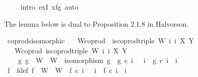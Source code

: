 \begin{isabellebody}
\ \ \ \ \isamarkupfalse%
{\isacharparenleft}{\kern0pt}intro\ exI{\isacharbrackleft}{\kern0pt}\ x{\isacharequal}{\kern0pt}{\isachardoublequoteopen}f{\isasymamalg}g{\isachardoublequoteclose}{\isacharbrackright}{\kern0pt}{\isacharcomma}{\kern0pt}\ auto{\isacharparenright}{\kern0pt}\isanewline
{}\isamarkupfalse%
%
\endisatagproof
{\isafoldproof}%
%
\isadelimproof
%
\endisadelimproof
%
\begin{isamarkuptext}%
The lemma below is dual to Proposition 2.1.8 in Halvorson.%
\end{isamarkuptext}\isamarkuptrue%
\isamarkupfalse%
\ coprods{\isacharunderscore}{\kern0pt}isomorphic{\isacharcolon}{\kern0pt}\isanewline
\ \ \ W{\isacharunderscore}{\kern0pt}coprod{\isacharcolon}{\kern0pt}\ \ {\isachardoublequoteopen}is{\isacharunderscore}{\kern0pt}coprod{\isacharunderscore}{\kern0pt}triple\ {\isacharparenleft}{\kern0pt}W{\isacharcomma}{\kern0pt}\ i\ i\ X\ Y{\isachardoublequoteclose}\isanewline
\ \ \ W{\isacharprime}{\kern0pt}{\isacharunderscore}{\kern0pt}coprod{\isacharcolon}{\kern0pt}\ {\isachardoublequoteopen}is{\isacharunderscore}{\kern0pt}coprod{\isacharunderscore}{\kern0pt}triple\ {\isacharparenleft}{\kern0pt}W{\isacharprime}{\kern0pt}{\isacharcomma}{\kern0pt}\ i{\isacharprime}{\kern0pt}\ i{\isacharprime}{\kern0pt}\ X\ Y{\isachardoublequoteclose}\isanewline
\ \ \ {\isachardoublequoteopen}{\isasymexists}\ g{\isachardot}{\kern0pt}\ g\ {\isacharcolon}{\kern0pt}\ W\ {\isasymrightarrow}\ W{\isacharprime}{\kern0pt}\ {\isasymand}\ isomorphism\ g\ {\isasymand}\ g\ {\isasymcirc}\isactrlsub c\ i\ \ {\isacharequal}{\kern0pt}\ i{\isacharprime}{\kern0pt}\ {\isasymand}\ g\ {\isasymcirc}\isactrlsub c\ i\ {\isacharequal}{\kern0pt}\ i{\isacharprime}{\kern0pt}\isanewline
%
\isadelimproof
%
\endisadelimproof
%
\isatagproof
{}\isamarkupfalse%
\ {\isacharminus}{\kern0pt}\isanewline
\ \ \isamarkupfalse%
\ f\ \ f{\isacharunderscore}{\kern0pt}def{\isacharcolon}{\kern0pt}\ {\isachardoublequoteopen}f\ {\isacharcolon}{\kern0pt}\ W{\isacharprime}{\kern0pt}\ {\isasymrightarrow}\ W\ {\isasymand}\ f\ {\isasymcirc}\isactrlsub c\ i{\isacharprime}{\kern0pt}\ \ {\isacharequal}{\kern0pt}\ i\ {\isasymand}\ f\ {\isasymcirc}\isactrlsub c\ i{\isacharprime}{\kern0pt}\ {\isacharequal}{\kern0pt}\ i\isanewline

\end{isabellebody}
